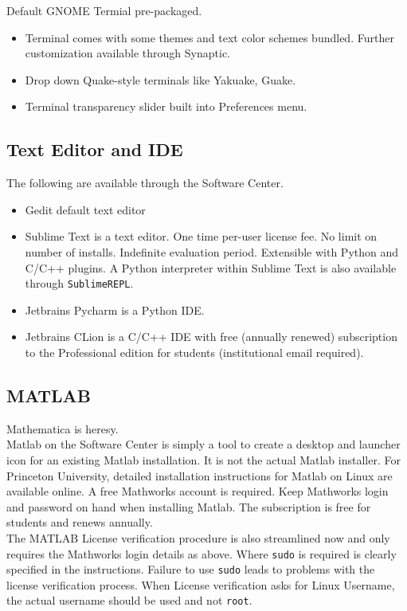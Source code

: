 \documentclass[12pt,letterpaper]{article}
\begin{document}
Default GNOME Termial pre-packaged.

\begin{itemize}
	\item Terminal comes with some themes and text color schemes bundled. Further customization available through Synaptic.
	\item Drop down Quake-style terminals like Yakuake, Guake.
	\item Terminal transparency slider built into Preferences menu.
\end{itemize}

\subsection{Text Editor and IDE}
The following are available through the Software Center.

\begin{itemize}
	\item Gedit default text editor
	\item Sublime Text is a text editor. One time per-user license fee. No limit on number of installs. Indefinite evaluation period. Extensible with Python and C/C++ plugins. A Python interpreter within Sublime Text is also available through \texttt{SublimeREPL}. 
	\item Jetbrains Pycharm is a Python IDE.
	\item Jetbrains CLion is a C/C++ IDE with free (annually renewed) subscription to the Professional edition for students (institutional email required).
\end{itemize}

\subsection{MATLAB}

Mathematica is heresy.\\

Matlab on the Software Center is simply a tool to create a desktop and launcher icon for an existing Matlab installation. It is not the actual Matlab installer.
For Princeton University, detailed installation instructions for Matlab on Linux are available online. A free Mathworks account is required. Keep Mathworks login and password on hand when installing Matlab. The subscription is free for students and renews annually.\\

The MATLAB License verification procedure is also streamlined now and only requires the Mathworks login details as above. Where \texttt{sudo} is required is clearly specified in the instructions. Failure to use \texttt{sudo} leads to problems with the license verification process. When License verification asks for Linux Username, the actual username should be used and not \texttt{root}.\\
\end{document}
